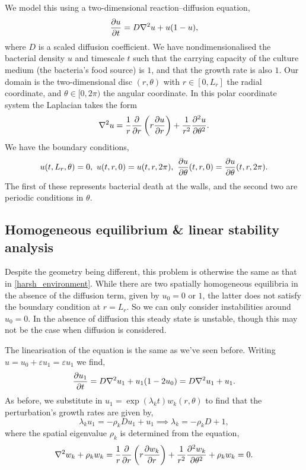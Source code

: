 \documentclass[main.tex]{subfiles}
\begin{document}
We model this using a two-dimensional reaction--diffusion equation,
\begin{equation}
    \pd{u}{t} = D\nabla^2 u + u(1-u),
\end{equation}
where $D$ is a scaled diffusion coefficient. We have nondimensionalised the bacterial density $u$ and timescale $t$ such that the carrying capacity of the culture medium (the bacteria's food source) is $1$, and that the growth rate is also $1$. Our domain is the two-dimensional disc $(r,\theta)$ with $r\in [0, L_r]$ the radial coordinate, and $\theta\in [0, 2\pi)$ the angular coordinate. In this polar coordinate system the Laplacian takes the form
\begin{equation}
\nabla^2u  = \frac{1}{r}\pd{}{r}\left(r \pd{u}{r}\right) + \frac{1}{r^2}\pdd{u}{\theta}.
\end{equation}
We have the boundary conditions,
\begin{equation}
    {u}(t,L_r,\theta) = 0,\,\, {u}(t,r,0) ={u}(t,r,2\pi),\,\,  \pd{u}{\theta}(t,r,0) = \pd{u}{\theta}(t,r,2\pi).
\end{equation}
The first of these represents bacterial death at the walls, and the second two are periodic conditions in $\theta$.

\subsection{Homogeneous equilibrium \& linear stability analysis}

Despite the geometry being different, this problem is otherwise the same as that in  \cref{harsh_environment}. While there are two spatially homogeneous equilibria in the absence of the diffusion term, given by $u_0=0$ or $1$, the latter does not satisfy the boundary condition at $r=L_r$. So we can only consider instabilities around $u_0=0$. In the absence of diffusion this steady state is unstable, though this may not be the case when diffusion is considered.

The linearisation of the equation is the same as we've seen before. Writing $u = u_0 + \varepsilon u_1 = \varepsilon u_1$ we find,
\begin{equation}\label{Petri_Linear}
    \pd{u_1}{t} = D\nabla^2 u_1 + u_1(1-2u_0) = D\nabla^2 u_1 + u_1.
\end{equation}
As before, we substitute in $u_1 = \exp(\lambda_k t)w_k(r,\theta)$ to find that the perturbation's growth rates are given by,
\begin{equation}\label{Disp_Bessel_Scalar}
    \lambda_k u_1 = -\rho_k D u_1 + u_1\implies \lambda_k = -\rho_k D + 1,
\end{equation}
where the spatial eigenvalue $\rho_k$ is determined from the equation,
\begin{equation}\label{eig_petri}
    \nabla^2w_k + \rho_k w_k  = \frac{1}{r}\pd{}{r}\left(r \pd{w_k}{r}\right) + \frac{1}{r^2}\pdd{w_k}{\theta} + \rho_k w_k = 0.
\end{equation}
\end{document}
